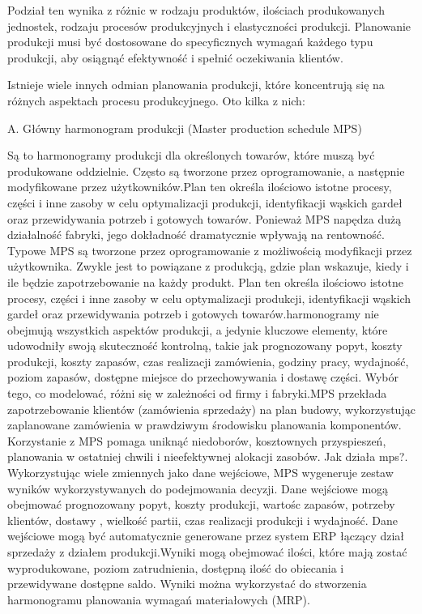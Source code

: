 Podział ten wynika z różnic w rodzaju produktów, ilościach produkowanych jednostek, rodzaju procesów produkcyjnych i elastyczności produkcji. Planowanie produkcji musi być dostosowane do specyficznych wymagań każdego typu produkcji, aby osiągnąć efektywność i spełnić oczekiwania klientów.


Istnieje wiele innych odmian planowania produkcji, które koncentrują się na różnych aspektach procesu produkcyjnego. Oto kilka z nich:

 A.  Główny harmonogram produkcji (Master production schedule MPS)

Są to harmonogramy produkcji dla określonych towarów, które muszą być produkowane oddzielnie. Często są tworzone przez oprogramowanie, a następnie modyfikowane przez użytkowników.Plan ten określa ilościowo istotne procesy, części i inne zasoby w celu optymalizacji produkcji, identyfikacji wąskich gardeł oraz przewidywania potrzeb i gotowych towarów. Ponieważ MPS napędza dużą działalność fabryki, jego dokładność  dramatycznie wpływają na rentowność. Typowe MPS są tworzone przez oprogramowanie z możliwością modyfikacji przez użytkownika.
 Zwykle jest to powiązane z produkcją, gdzie plan wskazuje, kiedy i ile będzie zapotrzebowanie na każdy produkt. Plan ten określa ilościowo istotne procesy, części i inne zasoby w celu optymalizacji produkcji, identyfikacji wąskich gardeł oraz przewidywania potrzeb i gotowych towarów.harmonogramy nie obejmują wszystkich aspektów produkcji, a jedynie kluczowe elementy, które udowodniły swoją skuteczność kontrolną, takie jak prognozowany popyt, koszty produkcji, koszty zapasów, czas realizacji zamówienia, godziny pracy, wydajność, poziom zapasów, dostępne miejsce do przechowywania i dostawę części. Wybór tego, co modelować, różni się w zależności od firmy i fabryki.MPS przekłada zapotrzebowanie klientów (zamówienia sprzedaży) na plan budowy, wykorzystując zaplanowane zamówienia w prawdziwym środowisku planowania komponentów. Korzystanie z MPS pomaga uniknąć niedoborów, kosztownych przyspieszeń, planowania w ostatniej chwili i nieefektywnej alokacji zasobów.
 Jak działa mps?. Wykorzystując wiele zmiennych jako dane wejściowe, MPS wygeneruje zestaw wyników wykorzystywanych do podejmowania decyzji. Dane wejściowe mogą obejmować prognozowany popyt, koszty produkcji, wartośc zapasów, potrzeby klientów, dostawy , wielkość partii, czas realizacji produkcji i wydajność. Dane wejściowe mogą być automatycznie generowane przez system ERP łączący dział sprzedaży z działem produkcji.Wyniki mogą obejmować ilości, które mają zostać wyprodukowane, poziom zatrudnienia, dostępną ilość do obiecania i przewidywane dostępne saldo. Wyniki można wykorzystać do stworzenia harmonogramu planowania wymagań materiałowych (MRP).

